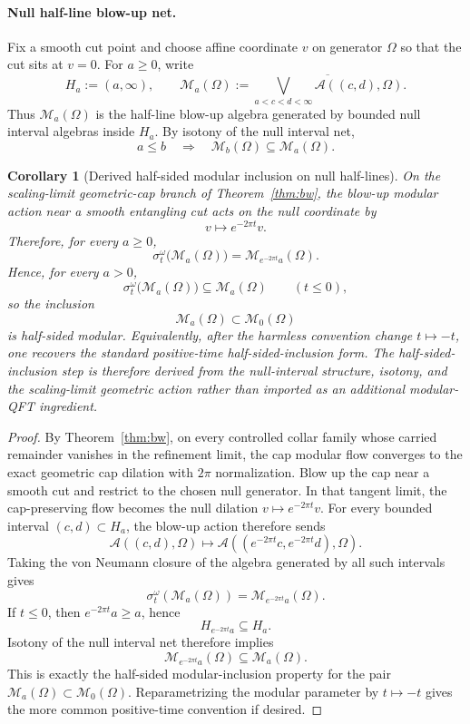 \documentclass[11pt]{article}
\newtheorem{corollary}[theorem]{Corollary}
\begin{document}
\paragraph{Null half-line blow-up net.}
Fix a smooth cut point and choose affine coordinate \(v\) on generator \(\Omega\) so that the cut sits at \(v=0\). For \(a\ge 0\), write
\[
H_a:=(a,\infty),
\qquad
\mathcal M_a(\Omega)
:=
\overline{\bigvee_{a<c<d<\infty}\mathcal A((c,d),\Omega)}.
\]
Thus \(\mathcal M_a(\Omega)\) is the half-line blow-up algebra generated by bounded null interval algebras inside \(H_a\). By isotony of the null interval net,
\[
a\le b
\quad\Longrightarrow\quad
\mathcal M_b(\Omega)\subseteq \mathcal M_a(\Omega).
\]

\begin{corollary}[Derived half-sided modular inclusion on null half-lines]\label{cor:n2}
On the scaling-limit geometric-cap branch of Theorem~\ref{thm:bw}, the blow-up modular action near a smooth entangling cut acts on the null coordinate by
\[
v\mapsto e^{-2\pi t}v.
\]
Therefore, for every \(a\ge 0\),
\[
\sigma_t^\omega\bigl(\mathcal M_a(\Omega)\bigr)
=
\mathcal M_{e^{-2\pi t}a}(\Omega).
\]
Hence, for every \(a>0\),
\[
\sigma_t^\omega\bigl(\mathcal M_a(\Omega)\bigr)\subseteq \mathcal M_a(\Omega)
\qquad (t\le 0),
\]
so the inclusion
\[
\mathcal M_a(\Omega)\subset \mathcal M_0(\Omega)
\]
is half-sided modular. Equivalently, after the harmless convention change \(t\mapsto -t\), one recovers the standard positive-time half-sided-inclusion form. The half-sided-inclusion step is therefore derived from the null-interval structure, isotony, and the scaling-limit geometric action rather than imported as an additional modular-QFT ingredient.
\end{corollary}

\begin{proof}
By Theorem~\ref{thm:bw}, on every controlled collar family whose carried remainder vanishes in the refinement limit, the cap modular flow converges to the exact geometric cap dilation with \(2\pi\) normalization. Blow up the cap near a smooth cut and restrict to the chosen null generator. In that tangent limit, the cap-preserving flow becomes the null dilation \(v\mapsto e^{-2\pi t}v\). For every bounded interval \((c,d)\subset H_a\), the blow-up action therefore sends
\[
\mathcal A((c,d),\Omega)\longmapsto \mathcal A((e^{-2\pi t}c,e^{-2\pi t}d),\Omega).
\]
Taking the von Neumann closure of the algebra generated by all such intervals gives
\[
\sigma_t^\omega(\mathcal M_a(\Omega))
=
\mathcal M_{e^{-2\pi t}a}(\Omega).
\]
If \(t\le 0\), then \(e^{-2\pi t}a\ge a\), hence
\[
H_{e^{-2\pi t}a}\subseteq H_a.
\]
Isotony of the null interval net therefore implies
\[
\mathcal M_{e^{-2\pi t}a}(\Omega)\subseteq \mathcal M_a(\Omega).
\]
This is exactly the half-sided modular-inclusion property for the pair \(\mathcal M_a(\Omega)\subset \mathcal M_0(\Omega)\). Reparametrizing the modular parameter by \(t\mapsto -t\) gives the more common positive-time convention if desired.
\end{proof}
\end{document}
